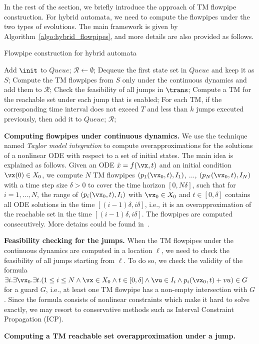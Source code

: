 In the rest of the section, we briefly introduce the approach of TM flowpipe construction. For hybrid automata, we need to compute the flowpipes under the two types of evolutions. The main framework is given by Algorithm~\ref{algo:hybrid_flowpipes}, and more details are also provided as follows.


\begin{algorithm}
 \caption{Flowpipe construction for hybrid automata}\label{algo:hybrid_flowpipes}
 \begin{algorithmic}[1]
  \STATE Add $\init$ to $\textit{Queue}$;
  \STATE $\mathcal{R} \leftarrow \emptyset$;
   \STATE Dequeue the first state set in $\textit{Queue}$ and keep it as $S$;
   \STATE Compute the TM flowpipes from $S$ only under the continuous dynamics and add them to $\mathcal{R}$;
   \STATE Check the feasibility of all jumps in $\trans$;
   \STATE Compute a TM for the reachable set under each jump that is enabled;
   \STATE For each TM, if the corresponding time interval does not exceed $T$ and less than $k$ jumps executed previously, then add it to $\textit{Queue}$;
  \ENDWHILE
  \RETURN $\mathcal{R}$;
 \end{algorithmic}
\end{algorithm}


\noindent\textbf{Computing flowpipes under continuous dynamics.}
We use the technique named \emph{Taylor model integration} to compute overapproximations for the solutions of a nonlinear ODE with respect to a set of initial states. The main idea is explained as follows. Given an ODE $\dot{x} = f(\vx,t)$ and an initial condition $\vx(0) \in X_0$, we compute $N$ TM flowpipes $(p_1(\vx_0,t), I_1)$, $\dots$, $(p_N(\vx_0,t), I_N)$ with a time step size $\delta > 0$ to cover the time horizon $[0,N\delta]$, such that for $i=1,\dots,N$, the range of $(p_i(\vx_0,t), I_i)$ with $\vx_0\in X_0$ and $t\in [0,\delta]$ contains all ODE solutions in the time $[(i-1)\delta, i\delta]$, i.e., it is an overapproximation of the reachable set in the time $[(i-1)\delta, i\delta]$. The flowpipes are computed consecutively. More detains could be found in~\cite{Berz+Makino/1998/Verified, Chen/2015/phd}.



\noindent\textbf{Feasibility checking for the jumps.}
When the TM flowpipes under the continuous dynamics are computed in a location $\ell$, we need to check the feasibility of all jumps starting from $\ell$. To do so, we check the validity of the formula $\exists i.\exists \vx_0.\exists t.(1\leq i\leq N \wedge \vx\in X_0 \wedge t\in [0,\delta] \wedge \vu\in I_i \wedge p_i(\vx_0,t) + vu) \in G$ for a guard $G$, i.e., at least one TM flowpipe has a non-empty intersection with $G$. Since the formula consists of nonlinear constraints which make it hard to solve exactly, we may resort to conservative methods such as Interval Constraint Propagation (ICP).




\noindent\textbf{Computing a TM reachable set overapproximation under a jump.}


